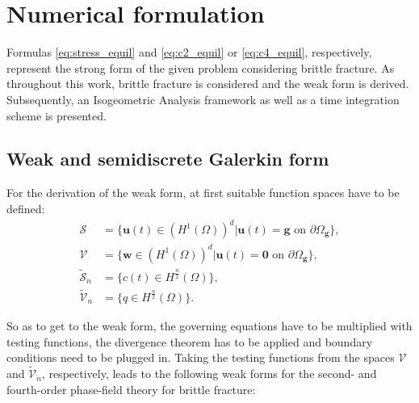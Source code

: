 \section{Numerical formulation} \label{sec:num_formul}
Formulas \eqref{eq:stress_equil} and \eqref{eq:c2_equil} or \eqref{eq:c4_equil}, respectively, represent the strong form of the given problem considering brittle fracture. As throughout this work, brittle fracture is considered and the weak form is derived. Subsequently, an Isogeometric Analysis framework as well as a time integration scheme is presented.

\subsection{Weak and semidiscrete Galerkin form} \label{sec:weak_Gal_form}
For the derivation of the weak form, at first suitable function spaces have to be defined:
\begin{equation} \label{eq:fct_spaces}
	\begin{aligned}
		\bm{\mathcal{S}} &= \{\mathbf{u}\left(t\right)\in\left(H^{1}\left(\Omega\right)\right)^{d}|\mathbf{u}\left(t\right)=\mathbf{g} \text{ on }\partial\Omega_{\mathbf{g}}\}, \\
		\bm{\mathcal{V}} &= \{\mathbf{w}\in\left(H^{1}\left(\Omega\right)\right)^{d}|\mathbf{u}\left(t\right)=\mathbf{0} \text{ on }\partial\Omega_{\mathbf{g}}\}, \\		
		\tilde{\mathcal{S}}_{n} &= \{c\left(t\right)\in H^{\frac{n}{2}}\left(\Omega\right)\}, \\
		\tilde{\mathcal{V}}_{n} &= \{q\in H^{\frac{n}{2}}\left(\Omega\right)\}.
	\end{aligned}
\end{equation}

So as to get to the weak form, the governing equations have to be multiplied with testing functions, the divergence theorem has to be applied and boundary conditions need to be plugged in. Taking the testing functions from the spaces $\mathbf{\mathcal{V}}$ and $\tilde{\mathcal{V}}_{n}$, respectively, leads to the following weak forms for the second- and fourth-order phase-field theory for brittle fracture:

